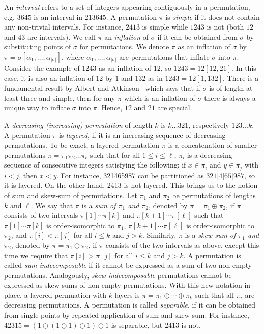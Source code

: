 \documentclass[12pt, a4paper, twoside]{report}
\begin{document}
An \emph{interval} refers to a set of integers appearing contiguously in a permutation, e.g. $3645$ is an interval in $213645$. A permutation $\pi$ is \emph{simple} if it does not contain any non-trivial intervals. For instance, $2413$ is simple while $1243$ is not (both $12$ and $43$ are intervals). We call $\pi$ an \emph{inflation} of $\sigma$ if it can be obtained from $\sigma$ by substituting points of $\sigma$ for permutations. We denote $\pi$ as an inflation of $\sigma$ by $\pi = \sigma[\alpha_1,\ldots,\alpha_{|\sigma|}]$, where $\alpha_1,\ldots,\alpha_{|\sigma|}$ are permutations that inflate $\sigma$ into $\pi$. Consider the example of $1243$ as an inflation of $12$, so $1243 = 12[12,21]$. In this case, it is also an inflation of $12$ by $1$ and $132$ as in $1243=12[1,132]$. There is a fundamental result by Albert and Atkinson~\cite{albertatkinsonrestricted} which says that if $\sigma$ is of length at least three and simple, then for any $\pi$ which is an inflation of $\sigma$ there is always a unique way to inflate $\sigma$ into $\pi$. Hence, $12$ and $21$ are special. 

A \emph{decreasing (increasing) permutation} of length $k$ is $k\ldots321$, respectively $123\ldots k$. A permutation $\pi$ is \emph{layered}, if it is an increasing sequence of decreasing permutations. To be exact, a layered permutation $\pi$ is a concatenation of smaller permutations $\pi= \pi_1\pi_2\ldots\pi_\ell$ such that for all $1 \leq i \leq \ell$, $\pi_i$ is a decreasing sequence of consecutive integers satisfying the following: if $x \in \pi_i$ and $y \in \pi_j$ with $i<j$, then $x<y$. For instance, 321465987 can be partitioned as $321|4|65|987$, so it is layered. On the other hand, 2413 is not layered. This brings us to the notion of sum and skew-sum of permutations. Let $\pi_1$ and $\pi_2$ be permutations of lengths $k$ and $\ell$. We say that $\pi$ is a \emph{sum of $\pi_1$ and $\pi_2$}, denoted by $\pi = \pi_1\oplus\pi_2$, if $\pi$ consists of two intervals $\pi[1]\cdots\pi[k]$ and $\pi[k+1]\cdots\pi[\ell]$ such that $\pi[1]\cdots\pi[k]$ is order-isomorphic to $\pi_1$, $\pi[k+1]\cdots\pi[\ell]$ is order-isomorphic to $\pi_2$, and $\pi[i] < \pi[j]$ for all $i\leq k$ and $j>k$. Similarly, $\pi$ is a \emph{skew-sum of $\pi_1$ and $\pi_2$}, denoted by $\pi = \pi_1\ominus \pi_2$, if $\pi$ consists of the two intervals as above, except this time we require that $\pi[i] > \pi[j]$ for all $i\leq k$ and $j > k$. A permutation is called \emph{sum-indecomposable} if it cannot be expressed as a sum of two non-empty permutations. Analogously, \emph{skew-indecomposable} permutations cannot be expressed as skew sums of non-empty permutations. With this new notation in place, a layered permuation with $k$ layers is $\pi = \pi_1\oplus\cdots\oplus \pi_k$ such that all $\pi_i$ are decreasing permutations. A permutation is called \emph{separable}, if it can be obtained from single points by repeated application of sum and skew-sum. For instance, $42315=(1\ominus (1\oplus 1)\ominus 1)\oplus 1$ is separable, but $2413$ is not.
\end{document}
